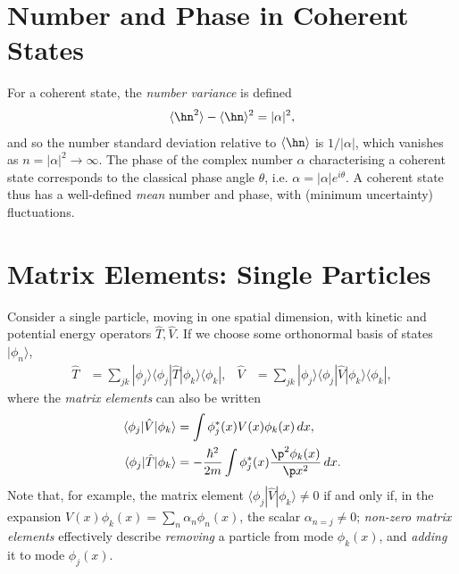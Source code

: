 \documentclass[a4paper, 11pt, normalem]{report}
\begin{document}
\section{Number and Phase in Coherent States}
For a coherent state, the \emph{number variance} is defined
\begin{align}
    \langle\hn^2\rangle-\langle\hn\rangle^2 = |\alpha|^2,
\end{align}
and so the number standard deviation relative to $\langle\hn\rangle$ is $1/|\alpha|$, which vanishes as $n=|\alpha|^2\to\infty$.
The phase of the complex number $\alpha$ characterising a coherent state corresponds to the classical phase angle $\theta$, i.e. $\alpha=|\alpha|e^{i\theta}$.
A coherent state thus has a well-defined \emph{mean} number and phase, with (minimum uncertainty) fluctuations.

\section{Matrix Elements: Single Particles}
Consider a single particle, moving in one spatial dimension, with kinetic and potential energy operators $\hat{T},\hat{V}$.
If we choose some orthonormal basis of states $|\phi_n\rangle$,
\begin{align}
    \hat{T} &= \sum_{jk} |\phi_j\rangle\langle\phi_j|\hat{T}|\phi_k\rangle\langle\phi_k|, & \hat{V} &= \sum_{jk} |\phi_j\rangle\langle\phi_j|\hat{V}|\phi_k\rangle\langle\phi_k|,
\end{align}
where the \emph{matrix elements} can also be written
\begin{align}
    \langle\phi_j|\hat{V}|\phi_k\rangle &= \int \phi_j^*(x)V(x)\phi_k(x)\,dx, \\
    \langle\phi_j|\hat{T}|\phi_k\rangle &= -\frac{\hbar^2}{2m}\int \phi_j^*(x)\frac{\p^2\phi_k(x)}{\p x^2}\,dx.
\end{align}
Note that, for example, the matrix element $\langle\phi_j|\hat{V}|\phi_k\rangle\neq0$ if and only if, in the expansion $V(x)\phi_k(x)=\sum_n\alpha_n\phi_n(x)$, the scalar $\alpha_{n=j}\neq0$; \emph{non-zero matrix elements} effectively describe \emph{removing} a particle from mode $\phi_k(x)$, and \emph{adding} it to mode $\phi_j(x)$.
\end{document}
